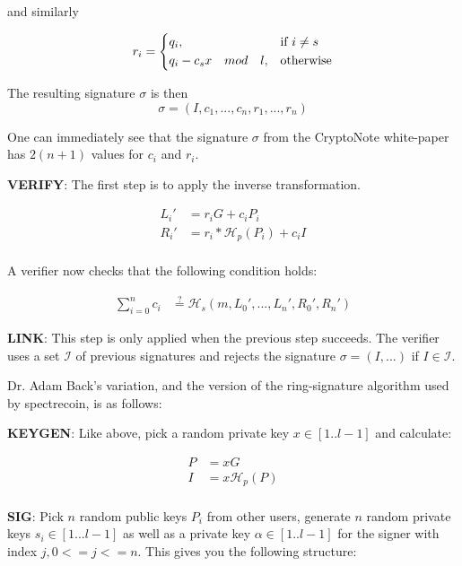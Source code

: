 and similarly

\[
r_i= 
\begin{dcases}
q_i,& \text{if } i \not= s\\
q_i-c_sx \quad mod\quad l,              & \text{otherwise}
\end{dcases}
\]

The resulting signature $\sigma$ is then
\[
\sigma = (I, c_1, ..., c_n, r_1, ..., r_n)
\]

One can immediately see that the signature $\sigma$ from the CryptoNote 
white-paper has $2(n+1)$ values for $c_i$ and $r_i$.

\hfill \break\textbf{VERIFY}: 
The first step is to apply the inverse transformation.

\begin{equation}
\begin{split}
L_i' &= r_iG+c_iP_i\\
R_i' &= r_i*\mathcal{H}_p(P_i)+c_iI\\ 
\end{split}
\end{equation}

A verifier now checks that the following condition holds:

\begin{equation}
\begin{split}
\sum_{i=0}^n c_i &\stackrel{?}{=}	 \mathcal{H}_s(m, L_0', ..., L_n', R_0', R_n')
\end{split}
\end{equation}

\hfill \break\textbf{LINK}: 
This step is only applied when the previous step succeeds. The verifier 
uses a set $\mathcal{I}$ of previous signatures and rejects the signature 
$\sigma = (I,... )$ if $I \in \mathcal{I}$.

\hfill \break Dr. Adam Back's variation, and the version of the ring-signature 
algorithm used by spectrecoin, is as follows:

\hfill \break\textbf{KEYGEN}: Like above, pick a random private key 
$x \in [1..l-1]$ and calculate:

\begin{equation}
\begin{split}
P &= xG\\
I &= x\mathcal{H}_p(P)\\ 
\end{split}
\end{equation}

\hfill \break\textbf{SIG}: Pick $n$ random public keys $P_i$ from other 
users, generate $n$ random private keys $s_i \in [1...l-1]$ as well as a 
private key $\alpha \in [1..l-1]$ for the signer with index $j, 0<=j<=n$. 
This gives you the following structure:

